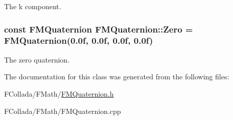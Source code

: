 \label{classFMQuaternion_a03d06578ec64cf8a4d2032c336153244}
The k component. \hypertarget{classFMQuaternion_a5607b2bda36fbfff32f3a1677e1ebebc}{
\subsubsection[{Zero}]{\setlength{\rightskip}{0pt plus 5cm}const {\bf FMQuaternion} {\bf FMQuaternion::Zero} = {\bf FMQuaternion}(0.0f, 0.0f, 0.0f, 0.0f)}}
\label{classFMQuaternion_a5607b2bda36fbfff32f3a1677e1ebebc}
The zero quaternion. 

The documentation for this class was generated from the following files:\begin{DoxyCompactItemize}
\item 
FCollada/FMath/\hyperlink{FMQuaternion_8h}{FMQuaternion.h}\item 
FCollada/FMath/FMQuaternion.cpp\end{DoxyCompactItemize}
